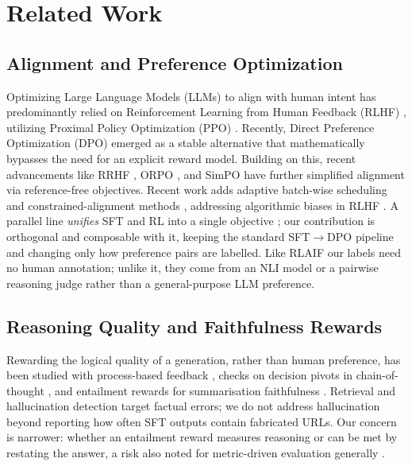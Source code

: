 \section{Related Work}
\label{sec:related_work}

\subsection{Alignment and Preference Optimization}
Optimizing Large Language Models (LLMs) to align with human intent has predominantly relied on Reinforcement Learning from Human Feedback (RLHF) \citep{ouyang2022training}, utilizing Proximal Policy Optimization (PPO) \citep{schulman2017proximal}. Recently, Direct Preference Optimization (DPO) \citep{rafailov2023direct} emerged as a stable alternative that mathematically bypasses the need for an explicit reward model. Building on this, recent advancements like RRHF \citep{yuan2023rrhf}, ORPO \citep{hong2024orpo}, and SimPO \citep{meng2024simpo} have further simplified alignment via reference-free objectives. Recent work adds adaptive batch-wise scheduling \citep{zhang2025adaptive} and constrained-alignment methods \citep{chen2025constrained}, addressing algorithmic biases in RLHF \citep{ji2024limits, shrivastava2024algorithmic}. A parallel line \emph{unifies} SFT and RL into a single objective \citep{liu2025uft, wang2024uft}; our contribution is orthogonal and composable with it, keeping the standard SFT$\to$DPO pipeline and changing only how preference pairs are labelled. Like RLAIF \citep{lee2023rlaif} our labels need no human annotation; unlike it, they come from an NLI model or a pairwise reasoning judge rather than a general-purpose LLM preference.
\subsection{Reasoning Quality and Faithfulness Rewards}
Rewarding the logical quality of a generation, rather than human preference, has been studied with process-based feedback \citep{uesato2023verify}, checks on decision pivots in chain-of-thought \citep{wang2025pivots}, and entailment rewards for summarisation faithfulness \citep{pasunuru2018multireward, roit2023factually}. Retrieval \citep{lewis2020retrieval} and hallucination detection \citep{li2023haludetect} target factual errors; we do not address hallucination beyond reporting how often SFT outputs contain fabricated URLs. Our concern is narrower: whether an entailment reward measures reasoning or can be met by restating the answer, a risk also noted for metric-driven evaluation generally \citep{schaeffer2023mirage}.

